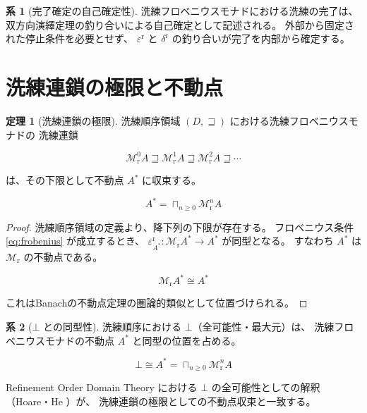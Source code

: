 \documentclass[11pt,a4paper]{article}
\theoremstyle{definition}
\newtheorem{theorem}{定理}[section]
\newtheorem{corollary}{系}[section]
\newcommand{\Mr}{\mathcal{M}_{\mathrm{r}}}
\newcommand{\epsr}{\varepsilon^{\mathrm{r}}}
\newcommand{\deltar}{\delta^{\mathrm{r}}}
\DeclareMathOperator*{\bigsqcap}{\sqcap}
\begin{document}
\begin{corollary}[完了確定の自己確定性]
洗練フロベニウスモナドにおける洗練の完了は、
双方向演繹定理の釣り合いによる自己確定として記述される。
外部から固定された停止条件を必要とせず、
$\epsr$ と $\deltar$ の釣り合いが完了を内部から確定する。
\end{corollary}

\section{洗練連鎖の極限と不動点}

\begin{theorem}[洗練連鎖の極限]
洗練順序領域 $(D, \sqsupseteq)$ における洗練フロベニウスモナドの
洗練連鎖

\begin{equation}
\Mr^0 A \sqsupseteq \Mr^1 A \sqsupseteq \Mr^2 A \sqsupseteq \cdots
\end{equation}

は、その下限として不動点 $A^*$ に収束する。

\begin{equation}
A^* = \bigsqcap_{n \geq 0} \Mr^n A
\end{equation}
\end{theorem}

\begin{proof}
洗練順序領域の定義より、降下列の下限が存在する。
フロベニウス条件 \eqref{eq:frobenius} が成立するとき、
$\epsr_{A^*}: \Mr A^* \to A^*$ が同型となる。
すなわち $A^*$ は $\Mr$ の不動点である。

\begin{equation}
\Mr A^* \cong A^*
\end{equation}

これはBanachの不動点定理の圏論的類似として位置づけられる。
\end{proof}

\begin{corollary}[$\bot$ との同型性]
洗練順序における $\bot$（全可能性・最大元）は、
洗練フロベニウスモナドの不動点 $A^*$ と同型の位置を占める。

\begin{equation}
\bot \cong A^* = \bigsqcap_{n \geq 0} \Mr^n A
\end{equation}

Refinement Order Domain Theory における $\bot$ の全可能性としての解釈
（Hoare・He \cite{Hoare1998}）が、
洗練連鎖の極限としての不動点収束と一致する。
\end{corollary}
\end{document}

